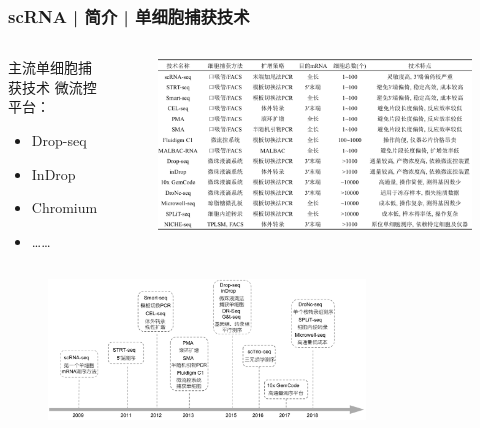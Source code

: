 \documentclass[11pt]{ctexbeamer}
\begin{document}
\begin{frame}
  \frametitle{scRNA | 简介 |  单细胞捕获技术}
  \begin{columns}
  \begin{block}{主流单细胞捕获技术}
  \alert{微流控平台}：
  \begin{itemize}
    \item Drop-seq
    \item InDrop
    \item \alert{Chromium}
    \item ……
  \end{itemize}
  \end{block}
      \begin{figure}
    \centering
    \includegraphics[width=\textwidth]{scRNA_compare_01.png}
  \end{figure}
  \end{columns}
  \vspace{-0.3em}
     \begin{figure}
    \centering
    \includegraphics[width=0.75\textwidth]{scRNA_history_02.png}
  \end{figure}
\end{frame}
\end{document}
